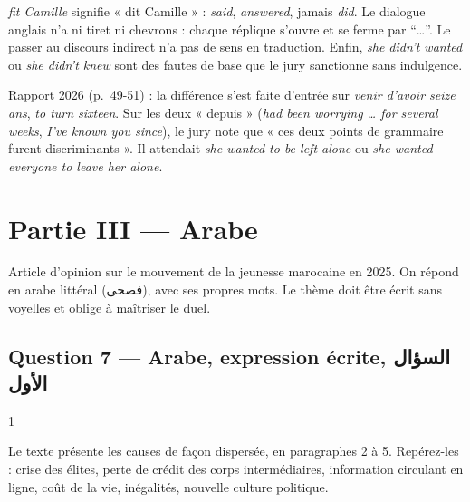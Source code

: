 \documentclass[11pt,a4paper]{article}
\begin{document}
\begin{piege}

\emph{fit Camille} signifie « dit Camille » : \emph{said}, \emph{answered}, jamais \emph{did}. Le dialogue anglais n'a ni tiret ni chevrons : chaque réplique s'ouvre et se ferme par ``\ldots{}''. Le passer au discours indirect n'a pas de sens en traduction. Enfin, \emph{she didn't wanted} ou \emph{she didn't knew} sont des fautes de base que le jury sanctionne sans indulgence.

\end{piege}

\begin{jury}

Rapport 2026 (p.~49-51) : la différence s'est faite d'entrée sur \emph{venir d'avoir seize ans}, \emph{to turn sixteen}. Sur les deux « depuis » (\emph{had been worrying \ldots{} for several weeks}, \emph{I've known you since}), le jury note que « ces deux points de grammaire furent discriminants ». Il attendait \emph{she wanted to be left alone} ou \emph{she wanted everyone to leave her alone}.

\end{jury}

\hypertarget{partie-iii-arabe}{%
\section{Partie III --- Arabe}\label{partie-iii-arabe}}

Article d'opinion sur le mouvement de la jeunesse marocaine en 2025. On répond en arabe littéral (فصحى), avec ses propres mots. Le thème doit être écrit sans voyelles et oblige à maîtriser le duel.

\hypertarget{question-7-arabe-expression-uxe9crite-ux627ux644ux633ux624ux627ux644-ux627ux644ux623ux648ux644}{%
\subsection{Question 7 --- Arabe, expression écrite, السؤال الأول}\label{question-7-arabe-expression-uxe9crite-ux627ux644ux633ux624ux627ux644-ux627ux644ux623ux648ux644}}

\begin{indication}{1}

Le texte présente les causes de façon dispersée, en paragraphes 2 à 5. Repérez-les : crise des élites, perte de crédit des corps intermédiaires, information circulant en ligne, coût de la vie, inégalités, nouvelle culture politique.

\end{indication}
\end{document}
